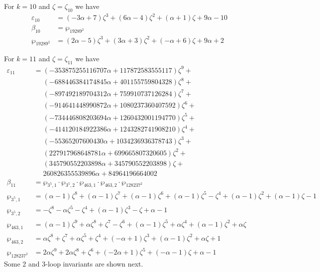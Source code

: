 \documentclass[12pt]{amsart}
\theoremstyle{definition}
\def\a{\alpha}
\def\z{\zeta}
\def\z{\zeta}
\begin{document}
\noindent 
For $k=10$ and $\zeta=\zeta_{10}$ we have
{\small
\begin{align*}
\varepsilon_{10} &=
(-3 \a + 7) \z^3 + (6 \a - 4) \z^2 + (\a + 1) \z + 9 \a - 10 \\
\beta_{10} &= \wp_{19289^2}  \\
\wp_{19289^2} &= (2 \a - 5) \z^3 + (3 \a + 3) \z^2 + (-\a + 6) \z + 9 \a + 2
\end{align*}
}

\noindent
For $k=11$ and $\zeta=\zeta_{11}$ we have
{\small
\begin{align*}
\varepsilon_{11} &= (-353875255116707 \a + 117872583555117) \zeta^9 +
\\ & \quad\,\,
(-688446384174845 \a + 401155759804328) \zeta^8 +
\\ & \quad\,\,
(-897492189704312 \a + 759910737126284) \zeta^7 +
\\ & \quad\,\,
(-914641448990872 \a + 1080237360407592) \zeta^6 +
\\ & \quad\,\,
(-734446808203694 \a + 1260432001194770) \zeta^5 +
\\ & \quad\,\,
(-414120184922386 \a + 1243282741908210) \zeta^4 +
\\ & \quad\,\,
(-55365207600430 \a + 1034236936378743) \zeta^3 + 
\\ & \quad\,\,
(227917968648781 \a + 699665807320605) \zeta^2 + 
\\ & \quad\,\,
(345790552203898 \a + 345790552203898) \zeta + 
\\ & \quad\,\,
260826355539896 \a + 84964196664002
\\
\beta_{11} &= \wp_{3^5,1} \cdot \wp_{3^5,2} \cdot \wp_{463,1} \cdot \wp_{463,2} 
\cdot \wp_{128237^2}\\
\wp_{3^5,1} &= (\a - 1) \zeta^8 + (\a - 1) \zeta^7 + (\a - 1) \zeta^6 
+ (\a - 1) \zeta^5 - \zeta^4 + (\a - 1) \zeta^2 + (\a - 1) \zeta - 1 
\\
\wp_{3^5,2} &=-\zeta^8 - \a \zeta^5 - \zeta^4 + (\a - 1) \zeta^3 - \zeta + \a - 1
\\
\wp_{463,1} &=(\a - 1) \zeta^9 + \a \zeta^8 + \zeta^7 - \zeta^6 
+ (\a - 1) \zeta^5 + \a \zeta^4 + (\a - 1) \zeta^2 + \a \zeta
\\
\wp_{463,2} &=\a \zeta^8 + \zeta^7 + \a \zeta^5 + \zeta^4 
+ (-\a + 1) \zeta^3 + (\a - 1) \zeta^2 + \a \zeta + 1
\\
\wp_{128237^2} &=2 \a \zeta^9 + 2 \a \zeta^8 + \zeta^6 
+ (-2 \a + 1) \zeta^5 + (-\a - 1) \zeta + \a - 1
\end{align*}
}
Some 2 and 3-loop invariants are shown next. 
\end{document}
